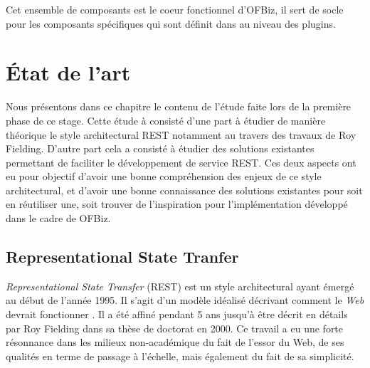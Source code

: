 \documentclass[a4paper, 11pt]{report}
\begin{document}
Cet ensemble de composants est le coeur fonctionnel d'OFBiz, il sert
de socle pour les composants spécifiques qui sont définit dans au
niveau des plugins.

\chapter{État de l'art}

Nous présentons dans ce chapitre le contenu de l'étude faite lors de
la première phase de ce stage.  Cette étude à consisté d'une part à
étudier de manière théorique le style architectural REST notamment au
travers des travaux de Roy Fielding.  D'autre part cela a consisté à
étudier des solutions existantes permettant de faciliter le
développement de service REST.  Ces deux aspects ont eu pour objectif
d'avoir une bonne compréhension des enjeux de ce style architectural,
et d'avoir une bonne connaissance des solutions existantes pour soit
en réutiliser une, soit trouver de l'inspiration pour l'implémentation
développé dans le cadre de OFBiz.

\section{Representational State Tranfer}

\emph{Representational State Transfer} (REST) est un style
architectural ayant émergé au début de l'année 1995.  Il s'agit d'un
modèle idéalisé décrivant comment le \emph{Web} devrait fonctionner
\cite{fielding2002principled}.  Il a été affiné pendant 5 ans jusqu'à
être décrit en détails par Roy Fielding dans sa thèse de doctorat
\cite{fielding2000architectural} en 2000.  Ce travail a eu une forte
résonnance dans les milieux non-académique du fait de l'essor du Web,
de ses qualités en terme de passage à l'échelle, mais également du
fait de sa simplicité.
\end{document}
